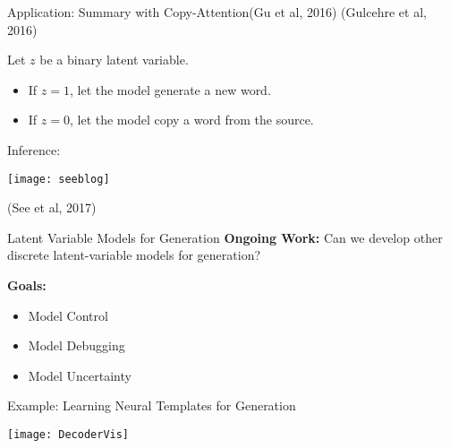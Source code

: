 \begin{frame}{Application: Summary with Copy-Attention}{(Gu et al, 2016) (Gulcehre et al, 2016)}

Let $z$ be a binary latent variable.
\air
\begin{itemize}
\item If $z = 1$, let the model generate a new word.
\item If $z = 0$, let the model copy a word from the source.
\end{itemize}
\air

Inference:
\begin{center}
\texttt{[image: seeblog]}

\centerline{\small (See et al, 2017)}
\end{center}
\end{frame}


\begin{frame}{ Latent Variable Models for Generation}
  \textbf{Ongoing Work:} Can we develop other discrete latent-variable models for generation?
  
  \air 

  \textbf{Goals:}

    \begin{itemize}
    \item Model Control
    \item Model Debugging
    \item Model Uncertainty
    \end{itemize}
\end{frame}



\begin{frame}{Example: Learning Neural Templates for Generation}

  \begin{center}
    \texttt{[image: DecoderVis]}
  \end{center}
\end{frame}

